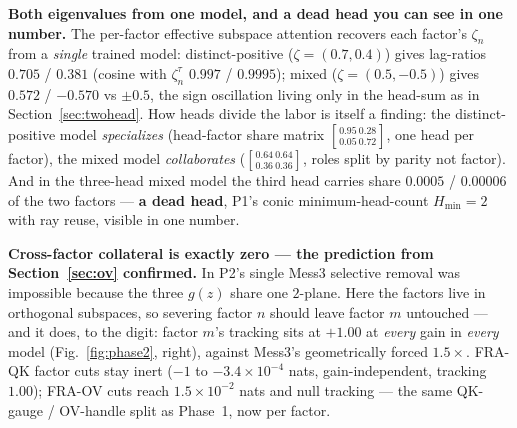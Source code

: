 \documentclass[11pt]{article}
\newcommand{\pzeta}{\zeta}
\newcommand{\gv}[1]{g(#1)}
\begin{document}
\textbf{Both eigenvalues from one model, and a dead head you can see in one
number.} The per-factor effective subspace attention recovers each factor's
$\pzeta_n$ from a \emph{single} trained model: distinct-positive ($\pzeta=
(0.7,0.4)$) gives lag-ratios $0.705$ / $0.381$ (cosine with $\pzeta_n^\tau$
$0.997$ / $0.9995$); mixed ($\pzeta=(0.5,-0.5)$) gives $0.572$ / $-0.570$ vs
$\pm0.5$, the sign oscillation living only in the head-sum as in
Section~\ref{sec:twohead}. How heads divide the labor is itself a finding: the
distinct-positive model \emph{specializes} (head-factor share matrix
$\genfrac[]{0pt}{1}{0.95\ 0.28}{0.05\ 0.72}$, one head per factor), the mixed
model \emph{collaborates} ($\genfrac[]{0pt}{1}{0.64\ 0.64}{0.36\ 0.36}$, roles
split by parity not factor). And in the three-head mixed model the third head
carries share $0.0005$ / $0.00006$ of the two factors --- \textbf{a dead head},
P1's conic minimum-head-count $H_{\min}=2$ with ray reuse, visible in one
number.

\textbf{Cross-factor collateral is exactly zero --- the prediction from
Section~\ref{sec:ov} confirmed.} In P2's single Mess3 selective removal was
impossible because the three $\gv{z}$ share one $2$-plane. Here the factors live
in orthogonal subspaces, so severing factor $n$ should leave factor $m$
untouched --- and it does, to the digit: factor $m$'s tracking sits at $+1.00$ at
\emph{every} gain in \emph{every} model (Fig.~\ref{fig:phase2}, right), against
Mess3's geometrically forced $1.5\times$. FRA-QK factor cuts stay inert
($-1$ to $-3.4\times10^{-4}$ nats, gain-independent, tracking $1.00$); FRA-OV
cuts reach $1.5\times10^{-2}$ nats and null tracking --- the same QK-gauge /
OV-handle split as Phase~1, now per factor.
\end{document}
